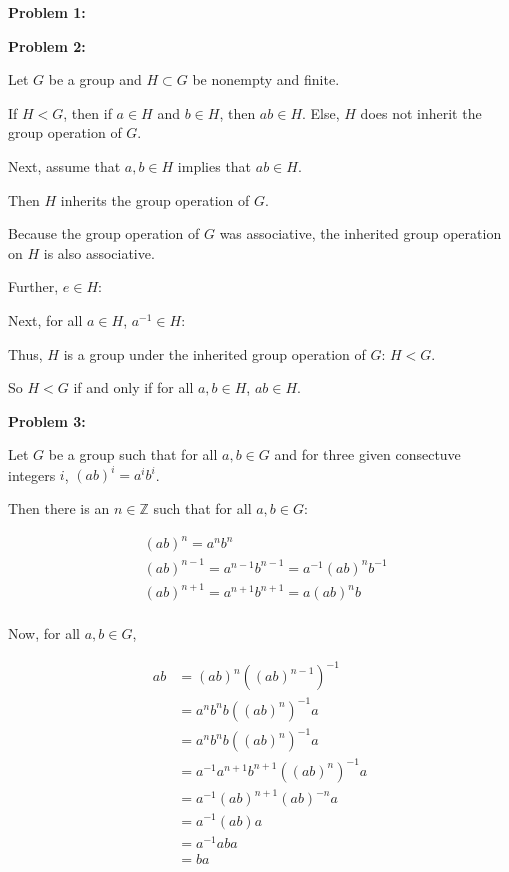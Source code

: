 \documentclass[a4paper,12pt]{article}
\newcommand{\tab}{\hspace{4mm}} %
\newcommand{\shunt}{\vspace{20mm}}
\newcommand{\Z}{\mathbb{Z}}
\begin{document}
{\bf Problem 1:}


\shunt

{\bf Problem 2:}

Let $G$ be a group and $H \subset G$ be nonempty and finite.

If $H < G$, then if $a \in H$ and $b \in H$, then $ab \in H$. Else, $H$ does not inherit the group operation of $G$.

Next, assume that $a,b \in H$ implies that $ab \in H$.

\tab Then $H$ inherits the group operation of $G$.

\tab Because the group operation of $G$ was associative, the inherited group operation on $H$ is also associative.

\tab Further, $e \in H$:

\tab \tab %

\tab Next, for all $a \in H$, $a^{-1} \in H$:

\tab \tab %

\tab Thus, $H$ is a group under the inherited group operation of $G$: $H<G$.

So $H<G$ if and only if for all $a, b \in H$, $ab \in H$.

\shunt

{\bf Problem 3:}

Let $G$ be a group such that for all $a,b \in G$ and for three given consectuve integers $i$, $(ab)^i = a^ib^i$.

Then there is an $n \in \Z$ such that for all $a, b \in G$:

\begin{align*}
&(ab)^n = a^nb^n \\
&(ab)^{n-1} = a^{n-1}b^{n-1} = a^{-1}(ab)^n b^{-1} \\
&(ab)^{n+1} = a^{n+1}b^{n+1} = a(ab)^nb \\
\end{align*}

Now, for all $a, b \in G$,

\begin{align*}
ab &= (ab)^n {((ab)^{n-1})}^{-1} \\
&=a^nb^n b ((ab)^{n})^{-1}a \\
&=a^nb^n b ((ab)^{n})^{-1}a \\
&=a^{-1}a^{n+1}b^{n+1}((ab)^{n})^{-1}a \\
&=a^{-1}(ab)^{n+1}(ab)^{-n}a \\
&=a^{-1}(ab)a \\
&=a^{-1}aba \\
&=ba
\end{align*}
\end{document}
